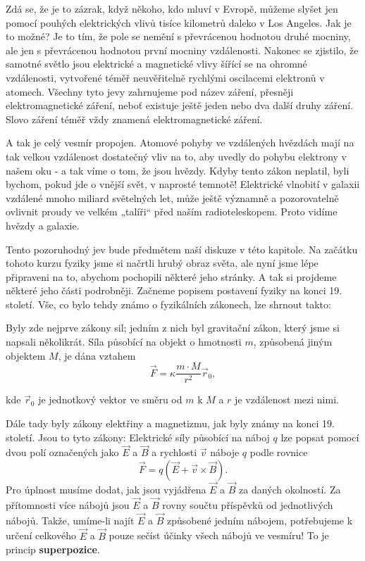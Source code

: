     Zdá se, že je to zázrak, když někoho, kdo mluví v Evropě, můžeme slyšet jen pomocí pouhých 
    elektrických vlivů tisíce kilometrů daleko v Los Angeles. Jak je to možné? Je to tím, že pole 
    se nemění s převrácenou hodnotou druhé mocniny, ale jen s převrácenou hodnotou první mocniny 
    vzdálenosti. Nakonec se zjistilo, že samotné světlo jsou elektrické a magnetické vlivy šířící 
    se na ohromné vzdálenosti, vytvořené téměř neuvěřitelně rychlými oscilacemi elektronů v 
    atomech. Všechny tyto jevy zahrnujeme pod název záření, přesněji elektromagnetické záření, 
    neboť existuje ještě jeden nebo dva další druhy záření. Slovo záření téměř vždy znamená 
    elektromagnetické záření.
    
    A tak je celý vesmír propojen. Atomové pohyby ve vzdálených hvězdách mají na tak velkou 
    vzdálenost dostatečný vliv na to, aby uvedly do pohybu elektrony v našem oku - a tak víme o 
    tom, že jsou hvězdy. Kdyby tento zákon neplatil, byli bychom, pokud jde o vnější svět, v 
    naprosté temnotě! Elektrické vlnobití v galaxii vzdálené mnoho miliard světelných let, může 
    ještě významně a pozorovatelně ovlivnit proudy ve velkém „talíři“ před naším radioteleskopem. 
    Proto vidíme hvězdy a galaxie. 
    
    Tento pozoruhodný jev bude předmětem naší diskuze v této kapitole. Na začátku tohoto kurzu 
    fyziky jsme si načrtli hrubý obraz světa, ale nyní jsme lépe připraveni na to, abychom 
    pochopili některé jeho stránky. A tak si projdeme některé jeho části podrobněji. Začneme 
    popisem postavení fyziky na konci 19. století. Vše, co bylo tehdy známo o fyzikálních zákonech, 
    lze shrnout takto: 
    
    Byly zde nejprve zákony sil; jedním z nich byl gravitační zákon, který jsme si napsali 
    několikrát. Síla působící na objekt o hmotnosti \(m\), způsobená jiným objektem \(M\), je dána 
    vztahem
    \begin{equation}\label{fyz:eq296}
      \vec{F} = \kappa\dfrac{m\cdot M}{r^2}\vec{r}_0,
    \end{equation}
    
    kde \(\vec{r}_0\) je jednotkový vektor ve směru od \(m\) k \(M\) a \(r\) je vzdálenost mezi 
    nimi.
    
    Dále tady byly zákony elektřiny a magnetizmu, jak byly známy na konci 19. století. Jsou to tyto 
    zákony: Elektrické síly působící na náboj \(q\) lze popsat pomocí dvou polí označených jako 
    \(\vec{E}\) a \(\vec{B}\) a rychlosti \(\vec{v}\) náboje \(q\) podle rovnice
    \begin{equation}\label{fyz:eq297}
      \vec{F} = q (\vec{E} + \vec{v}\times\vec{B}). 
    \end{equation}
    Pro úplnost musíme dodat, jak jsou vyjádřena \(\vec{E}\) a \(\vec{B}\) za daných okolností. Za 
    přítomnosti více nábojů jsou \(\vec{E}\) a \(\vec{B}\) rovny součtu příspěvků od jednotlivých 
    nábojů. Takže, umíme-li najít \(\vec{E}\) a \(\vec{B}\) způsobené jedním nábojem, potřebujeme k 
    určení celkového \(\vec{E}\) a \(\vec{B}\) pouze sečíst účinky všech nábojů ve vesmíru! To je 
    princip \textbf{superpozice}.
    
